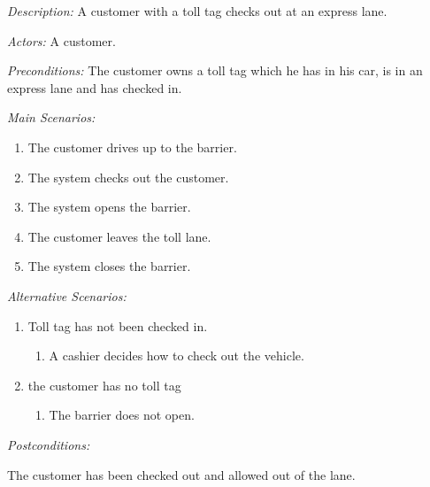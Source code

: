 \textit{Description:}
A customer with a toll tag checks out at an express lane.


\textit{Actors:}
A customer.


\textit{Preconditions:}
The customer owns a toll tag which he has in his car, is in an express
lane and has checked in.


\textit{Main Scenarios:}
\begin{enumerate}
\item The customer drives up to the barrier.
\item The system checks out the customer.
\item The system opens the barrier.
\item The customer leaves the toll lane.
\item The system closes the barrier.
\end{enumerate}

\textit{Alternative Scenarios:}
\begin{enumerate}
\item Toll tag has not been checked in.

\begin{enumerate}
\item A cashier decides how to check out the vehicle.
\end{enumerate}
\item the customer has no toll tag

\begin{enumerate}
\item The barrier does not open.
\end{enumerate}
\end{enumerate}

\textit{Postconditions:}

The customer has been checked out and allowed out of the lane.

